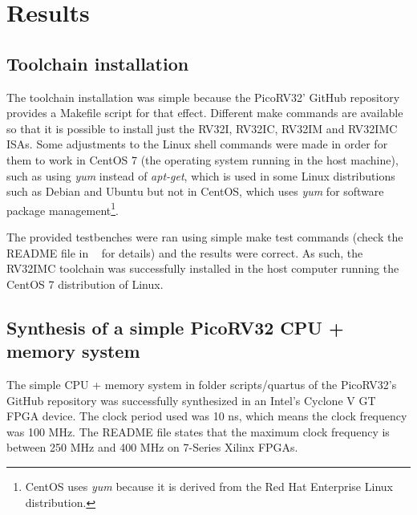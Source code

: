 
\chapter{Results}
\label{chapter:results}

\section{Toolchain installation}

The toolchain installation was simple because the PicoRV32' GitHub
repository~\cite{bib:picorv32} provides a Makefile script for that
effect. Different make commands are available so that it is possible to install
just the RV32I, RV32IC, RV32IM and RV32IMC ISAs. Some adjustments to the Linux
shell commands were made in order for them to work in CentOS 7 (the operating
system running in the host machine), such as using \textit{yum} instead of
\textit{apt-get}, which is used in some Linux distributions such as Debian and
Ubuntu but not in CentOS, which uses \textit{yum} for software package
management\footnote{CentOS uses \textit{yum} because it is derived from the Red
  Hat Enterprise Linux distribution.}.

The provided testbenches were ran using simple make test commands (check the
README file in ~\cite{bib:picorv32} for details) and the results were
correct. As such, the RV32IMC toolchain was successfully installed in the host
computer running the CentOS 7 distribution of Linux.

\section{Synthesis of a simple PicoRV32 CPU + memory system}
%
The simple CPU + memory system in folder scripts/quartus of the PicoRV32's
GitHub repository was successfully synthesized in an Intel's Cyclone V GT
FPGA device. The clock period used was 10 ns, which means the clock frequency was 100
MHz. The README file states that the maximum clock frequency is between 250 MHz
and 400 MHz on 7-Series Xilinx FPGAs.

